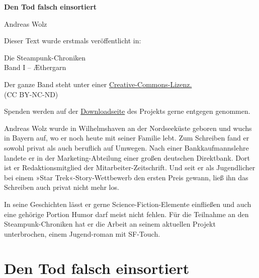 \usepackage[ngerman]{babel}
\usepackage[T1]{fontenc}



\renewcommand*{\tb}{\begin{center}* \quad * \quad *\end{center}}

\newcommand\bigpar\medskip


\raggedbottom
\begin{center}
\textbf{\huge\textsf{Den Tod falsch einsortiert}}

\bigskip

Andreas Wolz
\end{center}

\bigskip

\begin{flushleft}
Dieser Text wurde erstmals veröffentlicht in:
\begin{center}
Die Steampunk-Chroniken\\
Band I -- Æthergarn
\end{center}

\bigskip

Der ganze Band steht unter einer
\href{http://creativecommons.org/licenses/by-nc-nd/2.0/de/}{Creative-Commons-Lizenz.} \\
(CC BY-NC-ND)

\bigskip

Spenden werden auf der
\href{http://steampunk-chroniken.de/download}{Downloadseite}
des Projekts gerne entgegen genommen.

\vfill

Andreas Wolz wurde in Wilhelmshaven an der Nordseeküste geboren und
wuchs in Bayern auf, wo er noch heute mit seiner Familie lebt. Zum
Schreiben fand er sowohl privat als auch beruflich auf Umwegen.
Nach einer Bankkaufmannslehre landete er in der Marketing-Abteilung
einer großen deutschen Direktbank. Dort ist er Redaktionsmitglied
der Mitarbeiter-Zeitschrift. Und seit er als Jugendlicher bei einem
»Star Trek«-Story-Wettbewerb den ersten Preis gewann, ließ ihn das
Schreiben auch privat nicht mehr los.

In seine Geschichten lässt er gerne Science-Fiction-Elemente
einfließen und auch eine gehörige Portion Humor darf meist nicht
fehlen. Für die Teilnahme an den Steampunk-Chroniken hat er die
Arbeit an seinem aktuellen Projekt unterbrochen, einem Jugend-roman
mit SF-Touch.
\end{flushleft}

\section{Den Tod falsch einsortiert}


